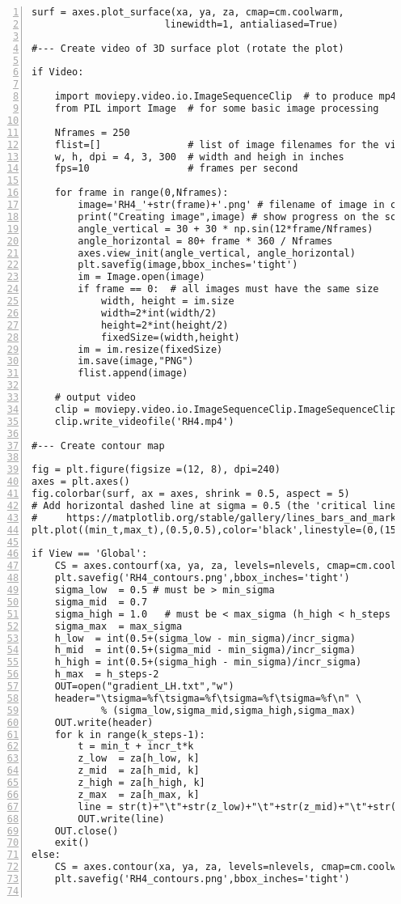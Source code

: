 \documentclass[oneside,10pt]{book}
\begin{document}
\begin{lstlisting}[numbers=left]
surf = axes.plot_surface(xa, ya, za, cmap=cm.coolwarm,
                       linewidth=1, antialiased=True)

#--- Create video of 3D surface plot (rotate the plot)

if Video:

    import moviepy.video.io.ImageSequenceClip  # to produce mp4 video
    from PIL import Image  # for some basic image processing

    Nframes = 250 
    flist=[]               # list of image filenames for the video
    w, h, dpi = 4, 3, 300  # width and heigh in inches
    fps=10                 # frames per second

    for frame in range(0,Nframes): 
        image='RH4_'+str(frame)+'.png' # filename of image in current frame
        print("Creating image",image) # show progress on the screen
        angle_vertical = 30 + 30 * np.sin(12*frame/Nframes)
        angle_horizontal = 80+ frame * 360 / Nframes
        axes.view_init(angle_vertical, angle_horizontal)
        plt.savefig(image,bbox_inches='tight')
        im = Image.open(image)
        if frame == 0:  # all images must have the same size
            width, height = im.size
            width=2*int(width/2)
            height=2*int(height/2)
            fixedSize=(width,height)
        im = im.resize(fixedSize) 
        im.save(image,"PNG")
        flist.append(image)

    # output video 
    clip = moviepy.video.io.ImageSequenceClip.ImageSequenceClip(flist, fps=fps) 
    clip.write_videofile('RH4.mp4')

#--- Create contour map

fig = plt.figure(figsize =(12, 8), dpi=240)
axes = plt.axes()
fig.colorbar(surf, ax = axes, shrink = 0.5, aspect = 5)
# Add horizontal dashed line at sigma = 0.5 (the 'critical line') 
#     https://matplotlib.org/stable/gallery/lines_bars_and_markers/linestyles.html
plt.plot((min_t,max_t),(0.5,0.5),color='black',linestyle=(0,(15,15)),linewidth=0.2)

if View == 'Global':
    CS = axes.contourf(xa, ya, za, levels=nlevels, cmap=cm.coolwarm) 
    plt.savefig('RH4_contours.png',bbox_inches='tight')
    sigma_low  = 0.5 # must be > min_sigma
    sigma_mid  = 0.7
    sigma_high = 1.0   # must be < max_sigma (h_high < h_steps -1)
    sigma_max  = max_sigma
    h_low  = int(0.5+(sigma_low - min_sigma)/incr_sigma)
    h_mid  = int(0.5+(sigma_mid - min_sigma)/incr_sigma)
    h_high = int(0.5+(sigma_high - min_sigma)/incr_sigma)
    h_max  = h_steps-2
    OUT=open("gradient_LH.txt","w")
    header="\tsigma=%f\tsigma=%f\tsigma=%f\tsigma=%f\n" \
            % (sigma_low,sigma_mid,sigma_high,sigma_max)
    OUT.write(header)
    for k in range(k_steps-1):
        t = min_t + incr_t*k
        z_low  = za[h_low, k]
        z_mid  = za[h_mid, k]
        z_high = za[h_high, k]
        z_max  = za[h_max, k]
        line = str(t)+"\t"+str(z_low)+"\t"+str(z_mid)+"\t"+str(z_high)+"\t"+str(z_max)+"\n"
        OUT.write(line)
    OUT.close()
    exit() 
else:
    CS = axes.contour(xa, ya, za, levels=nlevels, cmap=cm.coolwarm, linewidths=0.75) 
    plt.savefig('RH4_contours.png',bbox_inches='tight')


\end{lstlisting}
\end{document}
